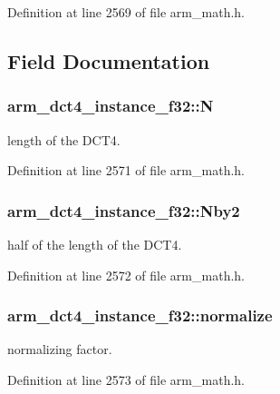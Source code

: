 Definition at line 2569 of file arm\-\_\-math.\-h.



\subsection{Field Documentation}
\hypertarget{structarm__dct4__instance__f32_a262b29a51c371b46efc89120e31ccf37}{
\subsubsection[{N}]{ arm\-\_\-dct4\-\_\-instance\-\_\-f32\-::\-N}}\label{structarm__dct4__instance__f32_a262b29a51c371b46efc89120e31ccf37}
length of the D\-C\-T4. 

Definition at line 2571 of file arm\-\_\-math.\-h.

\hypertarget{structarm__dct4__instance__f32_adb1ef2739ddbe62e5cdadc47455a4147}{
\subsubsection[{Nby2}]{ arm\-\_\-dct4\-\_\-instance\-\_\-f32\-::\-Nby2}}\label{structarm__dct4__instance__f32_adb1ef2739ddbe62e5cdadc47455a4147}
half of the length of the D\-C\-T4. 

Definition at line 2572 of file arm\-\_\-math.\-h.

\hypertarget{structarm__dct4__instance__f32_a61ce8c967b2e998a9c0041cca73cdef8}{
\subsubsection[{normalize}]{ arm\-\_\-dct4\-\_\-instance\-\_\-f32\-::normalize}}\label{structarm__dct4__instance__f32_a61ce8c967b2e998a9c0041cca73cdef8}
normalizing factor. 

Definition at line 2573 of file arm\-\_\-math.\-h.

